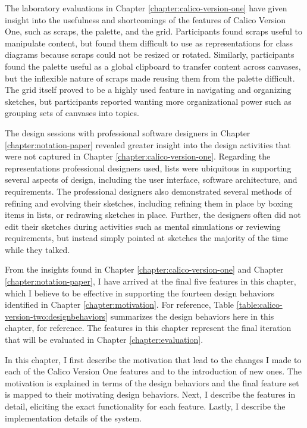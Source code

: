 \documentclass[12pt,fleqn]{ucithesis}
\begin{document}
The laboratory evaluations in Chapter \ref{chapter:calico-version-one} have given insight into the usefulness and shortcomings of the features of Calico Version One, such as scraps, the palette, and the grid. Participants found scraps useful to manipulate content, but found them difficult to use as representations for class diagrams because scraps could not be resized or rotated. Similarly, participants found the palette useful as a global clipboard to transfer content across canvases, but the inflexible nature of scraps made reusing them from the palette difficult. The grid itself proved to be a highly used feature in navigating and organizing sketches, but participants reported wanting more organizational power such as grouping sets of canvases into topics.

The design sessions with professional software designers in Chapter \ref{chapter:notation-paper} revealed greater insight into the design activities that were not captured in Chapter \ref{chapter:calico-version-one}. Regarding the representations professional designers used, lists were ubiquitous in supporting several aspects of design, including the user interface, software architecture, and requirements. The professional designers also demonstrated several methods of refining and evolving their sketches, including refining them in place by boxing items in lists, or redrawing sketches in place. Further, the designers often did not edit their sketches during activities such as mental simulations or reviewing requirements, but instead simply pointed at sketches the majority of the time while they talked.

From the insights found in Chapter \ref{chapter:calico-version-one} and Chapter \ref{chapter:notation-paper}, I have arrived at the final five features in this chapter, which I believe to be effective in supporting the fourteen design behaviors identified in Chapter \ref{chapter:motivation}. For reference, Table \ref{table:calico-version-two:designbehaviors} summarizes the design behaviors here in this chapter, for reference. The features in this chapter represent the final iteration that will be evaluated in Chapter \ref{chapter:evaluation}.

In this chapter, I first describe the motivation that lead to the changes I made to each of the Calico Version One features and to the introduction of new ones. The motivation is explained in terms of the design behaviors and the final feature set is mapped to their motivating design behaviors. Next, I describe the features in detail, eliciting the exact functionality for each feature. Lastly, I describe the implementation details of the system.
\end{document}
